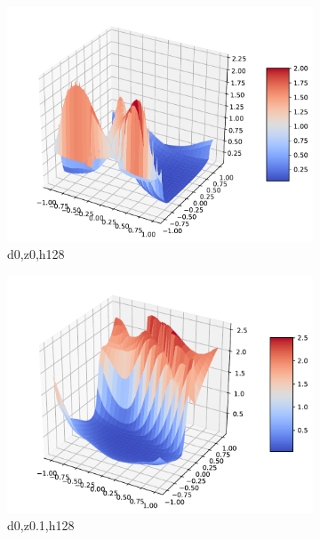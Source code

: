 \documentclass{article}
\begin{document}
\begin{figure}
\begin{subfigure}[b]{0.3\textwidth}
		\includegraphics[width=\textwidth]{report_images/d0_z0_h128_3D_2.pdf}
		\caption{d0,z0,h128}
    \end{subfigure}
    \begin{subfigure}[b]{0.3\textwidth}
        \centering
		\includegraphics[width=\textwidth]{report_images/d0_z0.1_h128_3D.pdf}
		\caption{d0,z0.1,h128}
    \end{subfigure}
    \begin{subfigure}[b]{0.3\textwidth}
        \centering

\end{subfigure}
\end{figure}
\end{document}
